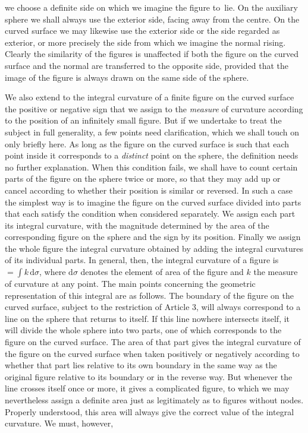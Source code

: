 %
we choose a definite side on which we imagine the figure to~lie. On the auxiliary sphere we shall always use the exterior side, facing away from the centre. On the curved surface we may likewise use the exterior side or the side regarded as exterior, or more precisely the side from which we imagine the normal rising. Clearly the similarity of the figures is unaffected if both the figure on the curved surface and the normal are transferred to the opposite side, provided that the image of the figure is always drawn on the same side of the sphere.

We also extend to the integral curvature of a finite figure on the curved surface the positive or negative sign that we assign to the \textit{measure} of curvature according to the position of an infinitely small figure. But if we undertake to treat the subject in full generality, a few points need clarification, which we shall touch on only briefly here. As long as the figure on the curved surface is such that each point inside it corresponds to a \textit{distinct} point on the sphere, the definition needs no further explanation. When this condition fails, we shall have to count certain parts of the figure on the sphere twice or more, so that they may add up or cancel according to whether their position is similar or reversed. In such a case the simplest way is to imagine the figure on the curved surface divided into parts that each satisfy the condition when considered separately. We assign each part its integral curvature, with the magnitude determined by the area of the corresponding figure on the sphere and the sign by its position. Finally we assign the whole figure the integral curvature obtained by adding the integral curvatures of its individual parts. In general, then, the integral curvature of a figure is \(=\int k\,\mathrm{d}\sigma\), where \(\mathrm{d}\sigma\) denotes the element of area of the figure and \(k\) the measure of curvature at any point. The main points concerning the geometric representation of this integral are as follows. The boundary of the figure on the curved surface, subject to the restriction of Article 3, will always correspond to a line on the sphere that returns to itself. If this line nowhere intersects itself, it will divide the whole sphere into two parts, one of which corresponds to the figure on the curved surface. The area of that part gives the integral curvature of the figure on the curved surface when taken positively or negatively according to whether that part lies relative to its own boundary in the same way as the original figure relative to its boundary or in the reverse way. But whenever the line crosses itself once or more, it gives a complicated figure, to which we may nevertheless assign a definite area just as legitimately as to figures without nodes. Properly understood, this area will always give the correct value of the integral curvature. We must, however, %
